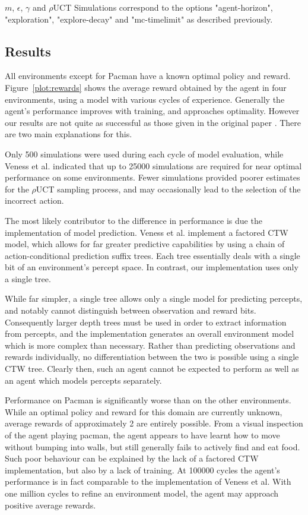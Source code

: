 \documentclass[paper=a4, fontsize=11pt]{scrartcl} %
\numberwithin{equation}{section} %
\numberwithin{figure}{section} %
\numberwithin{table}{section} %
\begin{document}
\noindent $m$, $\epsilon$, $\gamma$ and $\rho$UCT Simulations correspond to the options "agent-horizon", "exploration", "explore-decay" and "mc-timelimit" as described previously.

\subsection{Results}

All environments except for Pacman have a known optimal policy and reward. Figure~\ref{plot:rewards} shows the average reward obtained by the agent in four environments, using a model with various cycles of experience. Generally the agent's performance improves with training, and approaches optimality. However our results are not quite as successful as those given in the original paper \cite{VNHS09}. There are two main explanations for this.

Only 500 simulations were used during each cycle of model evaluation, while Veness et al. indicated that up to 25000 simulations are required for near optimal performance on some environments. Fewer simulations provided poorer estimates for the $\rho$UCT sampling process, and may occasionally lead to the selection of the incorrect action.

The most likely contributor to the difference in performance is due the implementation of model prediction. Veness et al. implement a factored CTW model, which allows for far greater predictive capabilities by using a chain of action-conditional prediction suffix trees. Each tree essentially deals with a single bit of an environment's percept space. In contrast, our implementation uses only a single tree.

While far simpler, a single tree allows only a single model for predicting percepts, and notably cannot distinguish between observation and reward bits. Consequently larger depth trees must be used in order to extract information from percepts, and the implementation generates an overall environment model which is more complex than necessary. Rather than predicting observations and rewards individually, no differentiation between the two is possible using a single CTW tree. Clearly then, such an agent cannot be expected to perform as well as an agent which models percepts separately.

Performance on Pacman is significantly worse than on the other environments. While an optimal policy and reward for this domain are currently unknown, average rewards of approximately 2 are entirely possible. From a visual inspection of the agent playing pacman, the agent appears to have learnt how to move without bumping into walls, but still generally fails to actively find and eat food. Such poor behaviour can be explained by the lack of a factored CTW implementation, but also by a lack of training. At 100000 cycles the agent's performance is in fact comparable to the implementation of Veness et al. With one million cycles to refine an environment model, the agent may approach positive average rewards.
\end{document}
